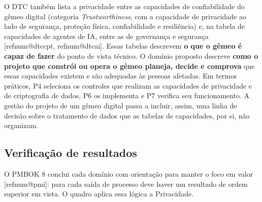 \documentclass[12pt,a4paper,article,oneside,english,brazil]{abntex2}
\makeatletter
\newcommand{\refnum}[1]{\csname refnum@#1\endcsname}
\makeatother
\begin{document}
O DTC também lista a privacidade entre as capacidades de confiabilidade do gêmeo digital (categoria \textit{Trustworthiness}, com a capacidade de privacidade ao lado de segurança, proteção física, confiabilidade e resiliência) e, na tabela de capacidades de agentes de IA, entre as de governança e segurança [\refnum{dtccpt}, \refnum{dtcai}]. Essas tabelas descrevem \textbf{o que o gêmeo é capaz de fazer} do ponto de vista técnico. O domínio proposto descreve \textbf{como o projeto que constrói ou opera o gêmeo planeja, decide e comprova} que essas capacidades existem e são adequadas às pessoas afetadas. Em termos práticos, P4 seleciona os controles que realizam as capacidades de privacidade e de criptografia de dados, P6 os implementa e P7 verifica seu funcionamento. A gestão do projeto de um gêmeo digital passa a incluir, assim, uma linha de decisão sobre o tratamento de dados que as tabelas de capacidades, por si, não organizam.
\subsection{Verificação de resultados}

O PMBOK 8 conclui cada domínio com orientação para manter o foco em valor [\refnum{pmi}]: para cada saída de processo deve haver um resultado de ordem superior em vista. O quadro aplica essa lógica a Privacidade.
\end{document}
